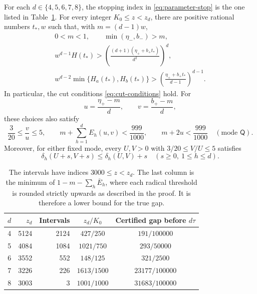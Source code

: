 \begin{proposition}
\label{prop:parameter-certificate}
For each $d\in\{4,5,6,7,8\}$, the stopping index in
\eqref{eq:parameter-stop} is the one listed in
Table~\ref{tab:parameter-certificate}.  For every integer
$K_0\le z<z_d$, there are positive rational numbers $t_*,w$ such that,
with $m=(d-1)w$,
\begin{equation}
\begin{gathered}
 0<m<1,\qquad \min(\eta_-,b_-)>m,\\
 w^{d-1}H(t_*)>
 \left(\frac{(d+1)(\eta_++b_+t_*)}{d^2}\right)^d,\\
 w^{d-2}\min\{H_a(t_*),H_b(t_*)\}>
 \left(\frac{\eta_++b_+t_*}{d-1}\right)^{d-1}.
\end{gathered}
\label{eq:parameter-cut-inequalities}
\end{equation}
In particular, the cut conditions \eqref{eq:cut-conditions} hold.
For
\[
 u=\frac{\eta_+-m}{d},\qquad
 v=\frac{b_+-m}{d},
\]
these choices also satisfy
\begin{equation}
 \frac3{20}\le\frac vu\le5,\qquad
 m+\sum_{h=1}^dE_h(u,v)<\frac{999}{1000},
 \qquad
 m+2u<\frac{999}{1000}\quad(\text{mode }\mathsf Q).
 \label{eq:parameter-saving}
\end{equation}
Moreover, for either fixed mode, every $U,V>0$ with
$3/20\le V/U\le5$ satisfies
\begin{equation}
 \delta_h(U+s,V+s)\le\delta_h(U,V)+s
 \quad(s\ge0,\ 1\le h\le d).
 \label{eq:parameter-shift}
\end{equation}
\end{proposition}

\begin{table}[ht]
\centering
\begin{tabular}{c|r|r|c|c}
 $d$ & $z_d$ & Intervals & $z_d/K_0$ & Certified gap before $d\tau$\\
 \hline
 4 & 5124 & 2124 & $427/250$ & $191/100000$\\
 5 & 4084 & 1084 & $1021/750$ & $293/50000$\\
 6 & 3552 & 552 & $148/125$ & $321/2500$\\
 7 & 3226 & 226 & $1613/1500$ & $23177/100000$\\
 8 & 3003 & 3 & $1001/1000$ & $31683/100000$
\end{tabular}
\caption{The intervals have indices $3000\le z<z_d$.
The last column is the minimum of $1-m-\sum_h\overline E_h$,
where each radical threshold is rounded strictly upwards as described
in the proof.  It is therefore a lower bound for the true gap.}
\label{tab:parameter-certificate}
\end{table}

